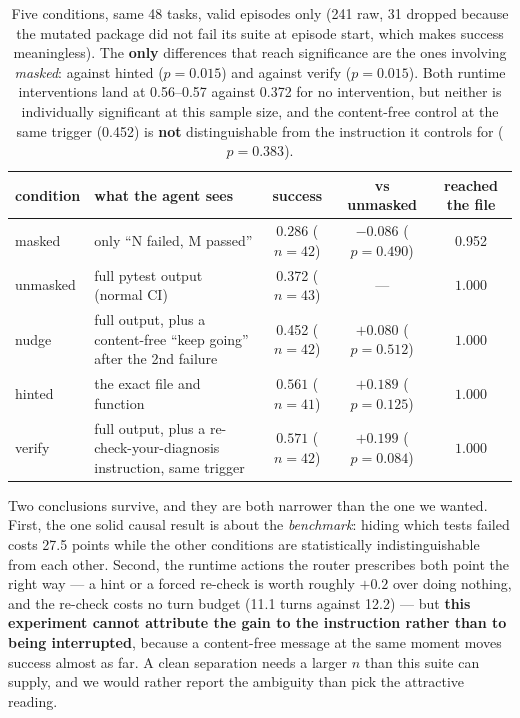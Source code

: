 \documentclass[10pt]{article}
\begin{document}
\begin{table}[h]
\centering\small
\begin{tabular}{llccc}
\toprule
condition & what the agent sees & success & vs unmasked & reached the file \\
\midrule
masked   & only ``N failed, M passed'' & $\mathbf{0.286}$ ($n=42$) & $-0.086$ ($p=0.490$) & 0.952 \\
unmasked & full pytest output (normal CI) & 0.372 ($n=43$) & --- & $\mathbf{1.000}$ \\
nudge    & full output, plus a content-free ``keep going'' after the 2nd failure & 0.452 ($n=42$) & $+0.080$ ($p=0.512$) & $\mathbf{1.000}$ \\
hinted   & the exact file and function & $\mathbf{0.561}$ ($n=41$) & $+0.189$ ($p=0.125$) & $\mathbf{1.000}$ \\
verify   & full output, plus a re-check-your-diagnosis instruction, same trigger & $\mathbf{0.571}$ ($n=42$) & $+0.199$ ($p=0.084$) & $\mathbf{1.000}$ \\
\bottomrule
\end{tabular}
\caption{Five conditions, same 48 tasks, valid episodes only (241 raw, 31 dropped because the
mutated package did not fail its suite at episode start, which makes success meaningless). The
\textbf{only} differences that reach significance are the ones involving \emph{masked}: against
hinted ($p=0.015$) and against verify ($p=0.015$). Both runtime interventions land at
0.56--0.57 against 0.372 for no intervention, but neither is individually significant at this
sample size, and the content-free control at the same trigger (0.452) is \textbf{not}
distinguishable from the instruction it controls for ($p=0.383$).}
\end{table}

\noindent Two conclusions survive, and they are both narrower than the one we wanted. First, the
one solid causal result is about the \emph{benchmark}: hiding which tests failed costs 27.5 points
while the other conditions are statistically indistinguishable from each other. Second, the runtime
actions the router prescribes both point the right way --- a hint or a forced re-check is worth
roughly $+0.2$ over doing nothing, and the re-check costs no turn budget (11.1 turns against 12.2)
--- but \textbf{this experiment cannot attribute the gain to the instruction rather than to being
interrupted}, because a content-free message at the same moment moves success almost as far. A
clean separation needs a larger $n$ than this suite can supply, and we would rather report the
ambiguity than pick the attractive reading.
\end{document}
